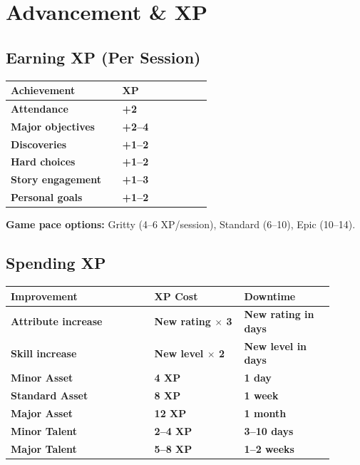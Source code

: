 \documentclass[10pt]{article}
\begin{document}
\section{Advancement \& XP}

\subsection{Earning XP (Per Session)}
\begin{coretable}[XP Breakdown]
\begin{tabular}{>{\bfseries}p{0.5\linewidth} >{\bfseries}p{0.4\linewidth}}
\toprule
\textbf{Achievement} & \textbf{XP} \\
\midrule
Attendance & +2 \\
Major objectives & +2–4 \\
Discoveries & +1–2 \\
Hard choices & +1–2 \\
Story engagement & +1–3 \\
Personal goals & +1–2 \\
\bottomrule
\end{tabular}
\end{coretable}
\textbf{Game pace options:} Gritty (4–6 XP/session), Standard (6–10), Epic (10–14).

\subsection{Spending XP}
\begin{coretable}[XP Costs]
\begin{tabular}{>{\bfseries}p{0.4\linewidth} >{\bfseries}p{0.25\linewidth} >{\bfseries}p{0.25\linewidth}}
\toprule
\textbf{Improvement} & \textbf{XP Cost} & \textbf{Downtime} \\
\midrule
Attribute increase & New rating $\times$ 3 & New rating in days \\
Skill increase & New level $\times$ 2 & New level in days \\
Minor Asset & 4 XP & 1 day \\
Standard Asset & 8 XP & 1 week \\
Major Asset & 12 XP & 1 month \\
Minor Talent & 2–4 XP & 3–10 days \\
Major Talent & 5–8 XP & 1–2 weeks \\
\bottomrule
\end{tabular}
\end{coretable}
\end{document}
